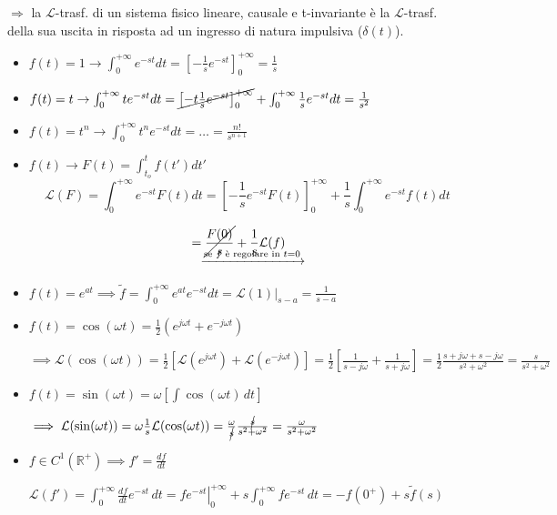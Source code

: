 \documentclass[11pt,a4paper]{report}
\begin{document}
$\Rightarrow$ la $\mathcal{L}$-trasf. di un sistema fisico lineare, causale e t-invariante è la $\mathcal{L}$-trasf. della sua uscita in risposta ad un ingresso di natura impulsiva ($\delta(t)$).

\begin{itemize}
    \item $f(t) = 1 \rightarrow \int_0^{+\infty} e^{-st} dt = \left[ - \frac{1}{s} e^{-st} \right]_0^{+\infty} = \frac{1}{s}$
    \item $f(t) = t \rightarrow \int_0^{+\infty} t e^{-st} dt = \cancel{\left[ - t \frac{1}{s} e^{-st} \right]_0^{+\infty}} + \int_0^{+\infty} \frac{1}{s} e^{-st} dt = \frac{1}{s^2}$
    \item $f(t) = t^n \rightarrow \int_0^{+\infty} t^n e^{-st} dt = \dots = \frac{n!}{s^{n+1}}$
    \item $f(t) \rightarrow F(t) = \int_{t_o}^t f(t') dt'$
    \[ \mathcal{L}(F) = \int_0^{+\infty} e^{-st} F(t) dt = \left[ -\frac{1}{s} e^{-st} F(t) \right]_0^{+\infty} + \frac{1}{s} \int_0^{+\infty} e^{-st} f(t) dt \]
\end{itemize}


\begin{align*}
    &= \cancel{\frac{F(0)}{s}} + \frac{1}{s}\mathcal{L}(f) \\[-0.5em]
    &\quad \makebox[0pt][l]{$\smash{\xrightarrow{\text{se } f \text{ è regolare in } t=0}}$} \notag
\end{align*}

\begin{itemize}
    \item $f(t) = e^{at} \implies \tilde{f} = \int_{0}^{+\infty} e^{at}e^{-st}dt = \mathcal{L}(1)\big|_{s-a} = \frac{1}{s-a}$
    \item $f(t) = \cos(\omega t) = \frac{1}{2}\left(e^{j\omega t} + e^{-j\omega t}\right)$
    
    $\implies \mathcal{L}(\cos(\omega t)) = \frac{1}{2}\left[\mathcal{L}(e^{j\omega t}) + \mathcal{L}(e^{-j\omega t})\right] = \frac{1}{2} \left[ \frac{1}{s-j\omega} + \frac{1}{s+j\omega} \right] = \frac{1}{2} \frac{s+j\omega + s - j\omega}{s^2 + \omega^2} = \frac{s}{s^2 + \omega^2}$
    
    \item $f(t) = \sin(\omega t) = \omega \left[ \int \cos(\omega t) \, dt \right]$
    
    $\implies \mathcal{L}(\sin(\omega t)) = \omega \frac{1}{s} \mathcal{L}(\cos(\omega t)) = \frac{\omega}{\cancel{s}} \frac{\cancel{s}}{s^2+\omega^2} = \frac{\omega}{s^2+\omega^2}$
    
    \item $f \in C^1(\mathbb{R}^+) \implies f' = \frac{df}{dt}$
    
    $\mathcal{L}(f') = \int_{0}^{+\infty} \frac{df}{dt} e^{-st} \, dt = \left. f e^{-st} \right|_0^{+\infty} + s \int_0^{+\infty} f e^{-st} \, dt = -f(0^+) + s\tilde{f}(s)$
\end{itemize}
\end{document}
